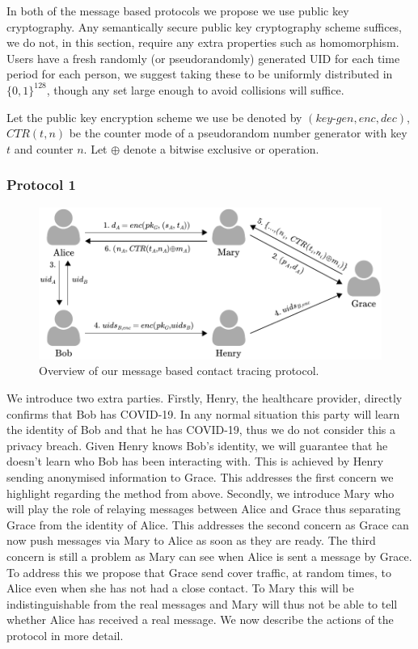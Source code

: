 \documentclass{article}
\begin{document}
 In both of the message based protocols we propose we use public key cryptography. Any semantically secure public key cryptography scheme suffices, we do not, in this section, require any extra properties such as homomorphism. Users have a fresh randomly (or pseudorandomly) generated UID for each time period for each person, we suggest taking these to be uniformly distributed in $\{0,1\}^{128}$, though any set large enough to avoid collisions will suffice.

Let the public key encryption scheme we use be denoted by $(\mathit{key\text{-}gen}, \mathit{enc}, \mathit{dec})$, $\mathit{CTR}(t,n)$ be the counter mode of a pseudorandom number generator with key $t$ and counter $n$. Let $\oplus$ denote a bitwise exclusive or operation.

\subsubsection*{Protocol 1} 

\begin{figure}
    \centering
    \includegraphics[scale=0.7]{method_1_symmetric.pdf}
    \caption{Overview of our message based contact tracing protocol.}
    \label{fig:message_based_protocol_1}
\end{figure}

 We introduce two extra parties. Firstly, Henry, the healthcare provider, directly confirms that Bob has COVID-19. In any normal situation this party will learn the identity of Bob and that he has COVID-19, thus we do not consider this a privacy breach. Given Henry knows Bob's identity, we will guarantee that he doesn't learn who Bob has been interacting with. This is achieved by Henry sending anonymised information to Grace. This addresses the first concern we highlight regarding the method from \cite{DBLP:journals/corr/abs-2003-11511} above. Secondly, we introduce Mary who will play the role of relaying messages between Alice and Grace thus separating Grace from the identity of Alice. This addresses the second concern as Grace can now push messages via Mary to Alice as soon as they are ready. The third concern is still a problem as Mary can see when Alice is sent a message by Grace. To address this we propose that Grace send cover traffic, at random times, to Alice even when she has not had a close contact. To Mary this will be indistinguishable from the real messages and Mary will thus not be able to tell whether Alice has received a real message. We now describe the actions of the protocol in more detail.
 
\end{document}
